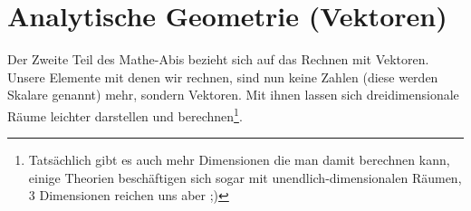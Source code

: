 \chapter{Analytische Geometrie (Vektoren)}
Der Zweite Teil des Mathe-Abis bezieht sich auf das Rechnen mit Vektoren. Unsere Elemente mit denen wir rechnen, sind nun keine Zahlen (diese werden Skalare genannt) mehr, sondern Vektoren. Mit ihnen lassen sich dreidimensionale Räume leichter darstellen und berechnen\footnote{Tatsächlich gibt es auch mehr Dimensionen die man damit berechnen kann, einige Theorien beschäftigen sich sogar mit unendlich-dimensionalen Räumen, 3 Dimensionen reichen uns aber ;)}.









